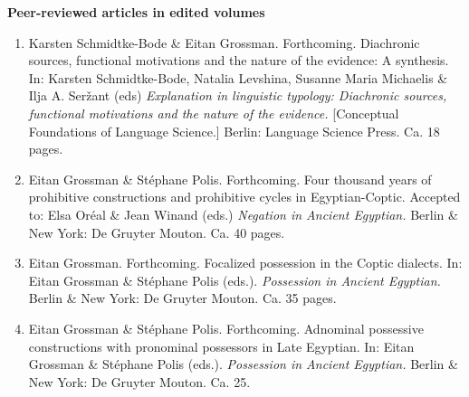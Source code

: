 \documentclass[letterpaper,11pt]{article}
\newcommand{\resheading}[1]{
\vspace*{6pt}
{\large \colorbox{mygrey}{\begin{minipage}{\textwidth}{\textbf{#1 \vphantom{p\^{E}}}}\end{minipage}}}
}
\begin{document}
\resheading{Peer-reviewed articles in edited volumes} 
\vspace*{6pt}
\hspace*{-10.5pt}
\vspace*{6pt}
\begin{enumerate}[resume]


\item	Karsten Schmidtke-Bode \& Eitan Grossman. Forthcoming. Diachronic sources, functional motivations and the nature of the evidence: A synthesis. In: Karsten Schmidtke-Bode, Natalia Levshina, Susanne Maria Michaelis \& Ilja A. Ser\v{z}ant (eds) \textit{Explanation in linguistic typology: Diachronic sources, functional motivations and the nature of the evidence.} [Conceptual Foundations of Language Science.] Berlin: Language Science Press. Ca. 18 pages.

\item Eitan Grossman \& St\'ephane Polis. Forthcoming. Four thousand years of prohibitive constructions and prohibitive cycles in Egyptian-Coptic. Accepted to: Elsa Or\'eal \& Jean Winand (eds.) \textit{Negation in Ancient Egyptian.} Berlin \& New York: De Gruyter Mouton. Ca. 40 pages.

\item Eitan Grossman. Forthcoming. Focalized possession in the Coptic dialects. In: Eitan Grossman \& St\'ephane Polis (eds.). \textit{Possession in Ancient Egyptian.} Berlin \& New York: De Gruyter Mouton.  Ca. 35 pages.

\item	Eitan Grossman \& St\'ephane Polis. Forthcoming. Adnominal possessive constructions with pronominal possessors in Late Egyptian. In: Eitan Grossman \& St\'ephane Polis (eds.). \textit{Possession in Ancient Egyptian.} Berlin \& New York: De Gruyter Mouton. Ca. 25.


\end{enumerate}
\end{document}
